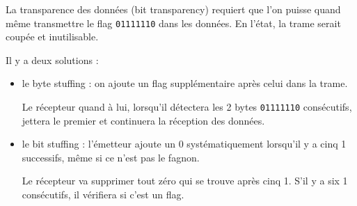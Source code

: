 	
	La transparence des données (bit transparency) requiert que l'on puisse quand même transmettre le flag \texttt{01111110} dans les données. En l'état, la trame serait coupée et inutilisable.

	Il y a deux solutions :
	
	\begin{itemize}		
		\item le byte stuffing : on ajoute un flag supplémentaire après celui dans la trame.
		
		Le récepteur quand à lui, lorsqu'il détectera les 2 bytes \texttt{01111110} consécutifs, jettera le premier et continuera la réception des données.
		\item le bit stuffing : l'émetteur ajoute un 0 systématiquement lorsqu'il y a cinq 1 successifs, même si ce n'est pas le fagnon.
		
		Le récepteur va supprimer tout zéro qui se trouve après cinq 1. S'il y a six 1 consécutifs, il vérifiera si c'est un flag.
	\end{itemize}